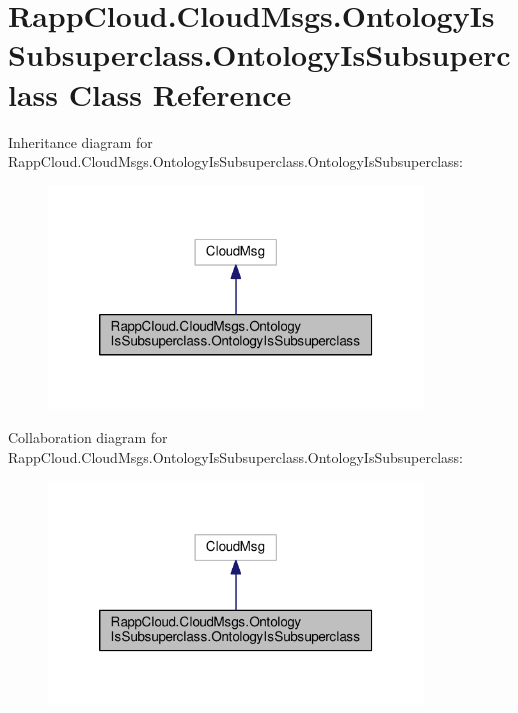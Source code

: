 \hypertarget{classRappCloud_1_1CloudMsgs_1_1OntologyIsSubsuperclass_1_1OntologyIsSubsuperclass}{\section{Rapp\-Cloud.\-Cloud\-Msgs.\-Ontology\-Is\-Subsuperclass.\-Ontology\-Is\-Subsuperclass Class Reference}
\label{classRappCloud_1_1CloudMsgs_1_1OntologyIsSubsuperclass_1_1OntologyIsSubsuperclass}
}


Inheritance diagram for Rapp\-Cloud.\-Cloud\-Msgs.\-Ontology\-Is\-Subsuperclass.\-Ontology\-Is\-Subsuperclass\-:
\nopagebreak
\begin{figure}[H]
\begin{center}
\leavevmode
\includegraphics[width=282pt]{classRappCloud_1_1CloudMsgs_1_1OntologyIsSubsuperclass_1_1OntologyIsSubsuperclass__inherit__graph}
\end{center}
\end{figure}


Collaboration diagram for Rapp\-Cloud.\-Cloud\-Msgs.\-Ontology\-Is\-Subsuperclass.\-Ontology\-Is\-Subsuperclass\-:
\nopagebreak
\begin{figure}[H]
\begin{center}
\leavevmode
\includegraphics[width=282pt]{classRappCloud_1_1CloudMsgs_1_1OntologyIsSubsuperclass_1_1OntologyIsSubsuperclass__coll__graph}
\end{center}
\end{figure}
